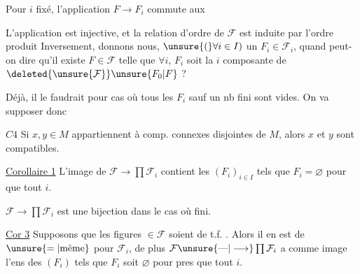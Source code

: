Pour $i$ fixé, l'application $F\longrightarrow F_i$ commute aux 

L'application
est injective, et la relation d'ordre de $\mathcal F$ est induite par l'ordre produit
Inversement, donnons nous,  $\unsure{(}\forall i\in I)$ un $F_i\in\mathcal F_i$, quand peut-on dire qu'il existe $F\in\mathcal F$ telle que $\forall i$, $F_i$ soit la $i$ composante de $\deleted{\unsure{\mathcal F}}\unsure{F_0|F}$ ?

Déjà, il le faudrait pour  cas où tous les $F_i$ sauf un nb fini sont \deleted{$\varnothing$} vides. On va supposer donc

\uline{$C4$} Si $x,y\in M$ appartiennent à  comp. connexes disjointes de $M$, alors $x$ et $y$ sont compatibles.

 

\uline{Corollaire 1} L'image de $\mathcal F\to\prod\mathcal F_i$ contient les $(F_i)_{i\in I}$ tels que $F_i=\varnothing$  pour que tout $i$.

  $\mathcal F\to\prod\mathcal F_i$ est une bijection dans  le  cas où    fini.



\uline{Cor 3} Supposons que les figures  $\in\mathcal F$ soient de t.f.  . Alors il en est de $\unsure{=|\text{même}}$  pour $\mathcal F_i$, de plus $\mathcal F\unsure{\text{---}|\longrightarrow}\prod\mathcal F_i$ a comme image l'ens des $(F_i)$ tels que $F_i$ soit $\varnothing$ pour pres que tout $i$.
